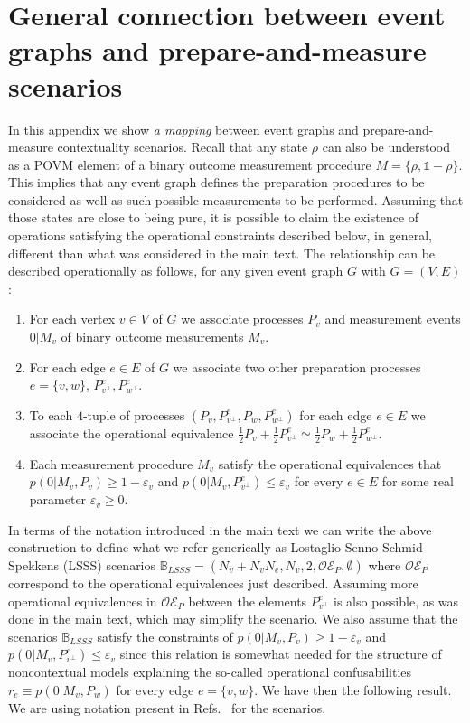 \documentclass[a4paper,twocolumn,11pt,accepted=2024-01-17]{quantumarticle}
\begin{document}
\section{General connection between event graphs and prepare-and-measure scenarios}\label{appendix: general}

In this appendix we show \textit{a mapping} between event graphs and prepare-and-measure contextuality scenarios. Recall that any state $\rho$ can also be understood as a POVM element of a binary outcome measurement procedure $M = \{\rho, \mathbb{1}-\rho\}$. This implies that any event graph defines  the preparation procedures to be considered as well as such possible measurements to be performed. Assuming that those states are close to being pure, it is possible to claim the existence of operations satisfying the operational constraints described below, in general, different than what was considered in the main text. The relationship can be described operationally as follows, for any given event graph $G$ with $G=(V,E)$:

\begin{enumerate}
    \item For each vertex $v \in V$ of $G$ we associate processes $P_v$ and measurement events $0\vert M_v$ of binary outcome measurements $M_v$. 
    \item For each edge $e \in E$ of $G$ we associate two other preparation processes $e= \{v,w\}$, $P_{v^\perp}^e, P_{w^\perp}^e$. 
    \item To each $4$-tuple of processes $(P_v,P_{v^\perp}^e,P_w,P_{w^\perp}^e)$ for each edge $e \in E$ we associate the operational equivalence $\frac{1}{2}P_v + \frac{1}{2}P_{v^\perp}^e \simeq \frac{1}{2}P_w + \frac{1}{2}P_{w^\perp}^e$.
    \item Each measurement procedure $M_v$ satisfy the operational equivalences that $p(0 \vert M_v,P_v) \geq 1-\varepsilon_v$ and $p(0 \vert M_v,P_{v^\perp}^e) \leq \varepsilon_v$ for every $e \in E$ for some real parameter $\varepsilon_v \geq 0$.
\end{enumerate}
In terms of the notation introduced in the main text we can write the above construction to define what we refer generically as Lostaglio-Senno-Schmid-Spekkens (LSSS) scenarios $\mathbb{B}_{LSSS} = (N_v + N_vN_e,N_v,2,\mathcal{OE}_P,\emptyset)$ where $\mathcal{OE}_P$ correspond to the operational equivalences just described. Assuming more operational equivalences in $\mathcal{OE}_P$ between the elements $P_{v^\perp}^e$ is also possible, as was done in the main text, which may simplify the scenario. We also assume that the scenarios $\mathbb{B}_{LSSS}$ satisfy the constraints of $p(0\vert M_v,P_v)\geq 1-\varepsilon_v$ and $p(0\vert M_v,P_{v^\perp}^e) \leq \varepsilon_v$ since this relation is somewhat needed for the structure of noncontextual models explaining the so-called operational confusabilities $r_{e} \equiv p(0\vert M_v,P_w)$ for every edge $e=\{v,w\}$. We have then the following result. We are using notation present in Refs.~\cite{chaturvedi2021characterising,wagner2021using} for the scenarios.
\end{document}
